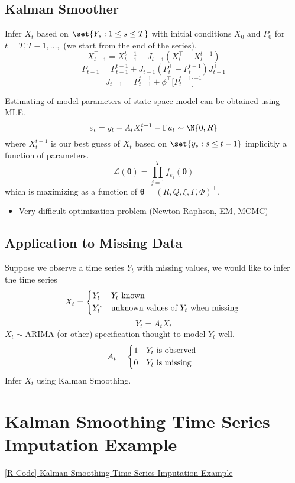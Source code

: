\subsection*{Kalman Smoother}
Infer $ X_t $ based on $ \set{Y_s:1\le s\le T} $ with initial conditions
$ X_0 $ and $ P_0 $ for $ t=T,T-1,\ldots, $ (we start from the end of the series).
\[ X_{t-1}^\top = X_{t-1}^{t-1}+J_{t-1}(X_t^\top - X_t^{t-1}) \]
\[ P_{t-1}^\top = P_{t-1}^{t-1}+J_{t-1}(P_t^\top - P_t^{t-1})J_{t-1}^\top \]
\[ J_{t-1}=P_{t-1}^{t-1}+\phi^\top\bigl[P_t^{t-1}\bigr]^{-1} \]
\begin{Remark}{}{}
    Estimating of model parameters of state space model can be obtained using MLE\@.
    \[ \varepsilon_t=y_t-A_t X_t^{t-1}-\Gamma u_t \sim \N{0,R} \]
    where $ X_t^{t-1} $ is our best guess of $ X_t $ based on $ \set{y_s:s\le t-1} $
    implicitly a function of parameters.
    \[ \mathcal{L}(\symbf{\theta})=\prod_{j=1}^T f_{\varepsilon_j}(\symbf{\theta}) \]
    which is maximizing as a function of $ \symbf{\theta}=(R,Q,\xi,\Gamma,\Phi)^\top $.
    \begin{itemize}
        \item Very difficult optimization problem (Newton-Raphson, EM, MCMC)
    \end{itemize}
\end{Remark}
\subsection*{Application to Missing Data}
Suppose we observe a time series $ Y_t $ with missing values, we would like to
infer the time series
\[ X_t=\begin{cases*}
        Y_t       & $ Y_t $ known                          \\
        Y_t^\star & unknown values of $ Y_t $ when missing
    \end{cases*} \]
\[ Y_t=A_t X_t \]
$ X_t \sim \text{ARIMA} $ (or other) specification thought to model $ Y_t $ well.
\[ A_t=\begin{cases*}
        1 & $ Y_t $ is observed \\
        0 & $ Y_t $ is missing
    \end{cases*} \]
Infer $ X_t $ using Kalman Smoothing.
\section{Kalman Smoothing Time Series Imputation Example}
\href{https://github.com/Hextical/university-notes/blob/master/year-3/semester-2/STAT%20443/code/12.5%20-%20Kalman%20Smoothing%20Time%20Series%20Imputation%20Example.R}{[R Code] Kalman Smoothing Time Series Imputation Example}
